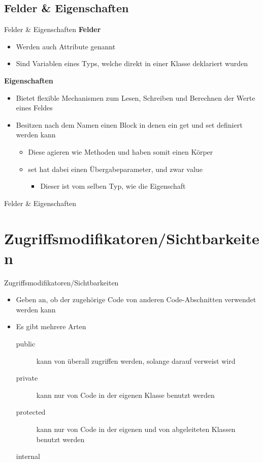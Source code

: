 \subsection{Felder \& Eigenschaften}
\begin{frame}{Felder \& Eigenschaften}
	\textbf{Felder}\\
	\begin{itemize}
		\item Werden auch Attribute genannt
		\item Sind Variablen eines Typs, welche direkt in einer Klasse deklariert wurden
	\end{itemize}
	\textbf{Eigenschaften}\\
	\begin{itemize}
		\item Bietet flexible Mechanismen zum Lesen, Schreiben und Berechnen der Werte eines Feldes
		\item Besitzen nach dem Namen einen Block in denen ein \alert{get} und \alert{set} definiert werden kann
		\begin{itemize}
			\item Diese agieren wie Methoden und haben somit einen Körper
			\item \alert{set} hat dabei einen Übergabeparameter, und zwar \alert{value}
			\begin{itemize}
				\item Dieser ist vom selben Typ, wie die Eigenschaft
			\end{itemize}
		\end{itemize}
	\end{itemize}
\end{frame}

\begin{frame}{Felder \& Eigenschaften}	
	
\end{frame}

\section{Zugriffsmodifikatoren/Sichtbarkeiten}
\begin{frame}{Zugriffsmodifikatoren/Sichtbarkeiten}
	\begin{itemize}
		\item Geben an, ob der zugehörige Code von anderen Code-Abschnitten verwendet werden kann
		\item Es gibt mehrere Arten
		\begin{description}
			\item[public] kann von überall zugriffen werden, solange darauf verweist wird
			\item[private] kann nur von Code in der eigenen Klasse benutzt werden
			\item[protected] kann nur von Code in der eigenen und von abgeleiteten Klassen benutzt werden
			\item[internal]
		\end{description}
	\end{itemize}
\end{frame}

